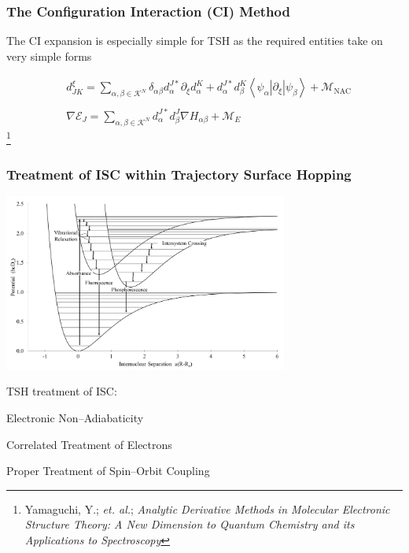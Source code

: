 \documentclass[usepdftitle=false,10pt]{beamer}
\newcommand{\cmark}{\color{green} \ding{51}}%
\newcommand{\done}{\rlap{$\square$}{\raisebox{2pt}{\large\hspace{1pt}\cmark}}%
\hspace{-2.5pt}}
\newcommand{\innerop}[3]{\left\langle #1 \left\vert #2 \right\vert #3 \right\rangle}  %
\newcommand\blfootnote[1]{%
  \begingroup
  \renewcommand\thefootnote{}\footnote{#1}%
  \addtocounter{footnote}{-1}%
  \endgroup
}
\begin{document}
\begin{frame}
  \frametitle{The Configuration Interaction (CI) Method}

  The CI expansion is especially simple for TSH as the required entities take on
  very simple forms

  \begin{align*}
    &d_{JK}^\xi = \sum_{\alpha,\beta \in \mathcal{K}^N} 
      \delta_{\alpha\beta} d_\alpha^{J*} \partial_\xi d_\alpha^K +
      d_\alpha^{J*} d_\beta^K 
      \innerop{\psi_\alpha}{\partial_\xi}{\psi_\beta} +
      \mathcal{M}_\mathrm{NAC} \\ \\
    &\nabla \mathcal{E}_J = \sum_{\alpha,\beta \in \mathcal{K}^N} 
      d_\alpha^{J*} d_\beta^J \nabla H_{\alpha\beta} +
      \mathcal{M}_E
  \end{align*}
  \blfootnote{\tiny Yamaguchi, Y.; \emph{et. al.}; \emph{Analytic Derivative Methods in Molecular Electronic Structure Theory: A New Dimension to Quantum Chemistry and its Applications to Spectroscopy}}
\end{frame}

\begin{frame}
  \frametitle{Treatment of ISC within Trajectory Surface Hopping}
  \begin{center}
  \includegraphics[width=0.7\textwidth]{ISC} 
  \end{center}
  \vspace{-0.5cm}
  TSH treatment of ISC: 
  \begin{mylist}
    \item[\done] Electronic Non--Adiabaticity
    \item[\done] Correlated Treatment of Electrons
    \item Proper Treatment of Spin--Orbit Coupling
  \end{mylist}
\end{frame}
\end{document}
